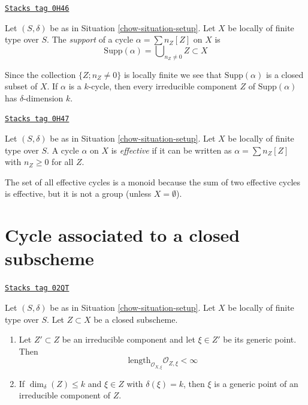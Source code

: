 \begin{definition}
\label{chow-definition-support-cycle}
\href{https://stacks.math.columbia.edu/tag/0H46}{\texttt{Stacks tag 0H46}}

Let $(S, \delta)$ be as in Situation \ref{chow-situation-setup}.
Let $X$ be locally of finite type over $S$.
The {\it support} of a cycle $\alpha = \sum n_Z [Z]$ on $X$
is
$$
\text{Supp}(\alpha) = \bigcup\nolimits_{n_Z \not = 0} Z \subset X
$$
\end{definition}

Since the collection $\{Z; n_Z \not = 0\}$ is locally finite
we see that $\text{Supp}(\alpha)$ is a closed subset of $X$.
If $\alpha$ is a $k$-cycle, then every irreducible component $Z$
of $\text{Supp}(\alpha)$ has $\delta$-dimension $k$.

\begin{definition}
\label{chow-definition-effective-cycle}
\href{https://stacks.math.columbia.edu/tag/0H47}{\texttt{Stacks tag 0H47}}

Let $(S, \delta)$ be as in Situation \ref{chow-situation-setup}.
Let $X$ be locally of finite type over $S$.
A cycle $\alpha$ on $X$ is {\it effective} if it
can be written as $\alpha =\sum n_Z [Z]$ with $n_Z \geq 0$ for all $Z$.
\end{definition}

The set of all effective cycles is a monoid because the sum of
two effective cycles is effective, but it is not a group
(unless $X = \emptyset$).

\section{Cycle associated to a closed subscheme}
\label{chow-section-cycle-of-closed-subscheme}
\begin{lemma}
\label{chow-lemma-multiplicity-finite}
\href{https://stacks.math.columbia.edu/tag/02QT}{\texttt{Stacks tag 02QT}}

Let $(S, \delta)$ be as in Situation \ref{chow-situation-setup}.
Let $X$ be locally of finite type over $S$.
Let $Z \subset X$ be a closed subscheme.
\begin{enumerate}
\item Let $Z' \subset Z$ be an irreducible component and
let $\xi \in Z'$ be its generic point.
Then
$$
\text{length}_{\mathcal{O}_{X, \xi}} \mathcal{O}_{Z, \xi} < \infty
$$
\item If $\dim_\delta(Z) \leq k$ and $\xi \in Z$ with
$\delta(\xi) = k$, then $\xi$ is a generic point of an
irreducible component of $Z$.
\end{enumerate}
\end{lemma}

